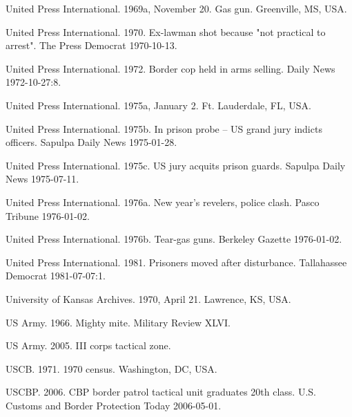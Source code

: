 \documentclass[
  11pt,
]{krantz}
\newlength{\cslhangindent}
\newlength{\cslentryspacingunit} %
\newenvironment{CSLReferences}[2] %
 {%
  \setlength{\parindent}{0pt}
  \ifodd #1
  \let\oldpar\par
  \def\par{\hangindent=\cslhangindent\oldpar}
  \fi
  \setlength{\parskip}{#2\cslentryspacingunit}
 }%
 {}
\begin{document}
\begin{CSLReferences}{1}{0}
\leavevmode{}%
United Press International. 1969a, November 20. Gas gun. Greenville, MS, USA.

\leavevmode{}%
United Press International. 1970. Ex-lawman shot because "not practical to arrest". The Press Democrat 1970-10-13.

\leavevmode{}%
United Press International. 1972. Border cop held in arms selling. Daily News 1972-10-27:8.

\leavevmode{}%
United Press International. 1975a, January 2. Ft. Lauderdale, FL, USA.

\leavevmode{}%
United Press International. 1975b. In prison probe -- US grand jury indicts officers. Sapulpa Daily News 1975-01-28.

\leavevmode{}%
United Press International. 1975c. US jury acquits prison guards. Sapulpa Daily News 1975-07-11.

\leavevmode{}%
United Press International. 1976a. New year's revelers, police clash. Pasco Tribune 1976-01-02.

\leavevmode{}%
United Press International. 1976b. Tear-gas guns. Berkeley Gazette 1976-01-02.

\leavevmode{}%
United Press International. 1981. Prisoners moved after disturbance. Tallahassee Democrat 1981-07-07:1.

\leavevmode{}%
University of Kansas Archives. 1970, April 21. Lawrence, KS, USA.

\leavevmode{}%
US Army. 1966. Mighty mite. Military Review XLVI.

\leavevmode{}%
US Army. 2005. III corps tactical zone.

\leavevmode{}%
USCB. 1971. 1970 census. Washington, DC, USA.

\leavevmode{}%
USCBP. 2006. CBP border patrol tactical unit graduates 20th class. U.S. Customs and Border Protection Today 2006-05-01.


\end{CSLReferences}
\end{document}

